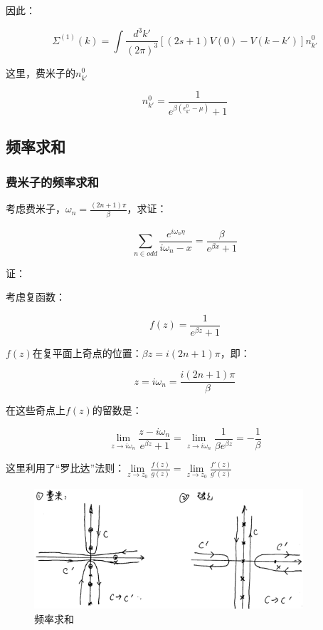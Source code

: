 因此：

\begin{equation}
\Sigma^{(1)}(k) = \int \frac{d^3 k'}{(2 \pi)^3} \left[ (2s+1)V(0) - V(k - k') \right] n^0_{k'}
\end{equation}

这里，费米子的$n^0_{k'}$

\begin{equation}
n^0_{k'} = \frac{1}{ e^{ \beta ( \epsilon^0_{k'} - \mu  ) } + 1 }
\end{equation}

\subsection{频率求和}

\subsubsection{费米子的频率求和}

考虑费米子，$\omega_n = \frac{ (2n+1) \pi}{\beta}$，求证：

\begin{equation}
\sum\limits_{n \in odd } \frac{e^{i \omega_n \eta}}{i \omega_n - x } =\frac{ \beta}{ e^{\beta x} + 1 }
\end{equation}

证：

考虑复函数：

\begin{equation}
f(z) = \frac{1}{e^{\beta z} + 1}
\end{equation}

$f(z)$在复平面上奇点的位置：$\beta z = i (2n +1) \pi$，即：

\begin{equation*}
z = i \omega_n = \frac{i (2n +1)\pi }{\beta}
\end{equation*}

在这些奇点上$f(z)$的留数是：

\begin{equation*}
\lim\limits_{z \to i\omega_n  } \frac{z - i \omega_n}{ e^{\beta z} + 1 } =  \lim\limits_{z \to i\omega_n  } \frac{1}{ \beta e^{\beta z}  } = - \frac{1}{\beta}
\end{equation*}

这里利用了“罗比达”法则：$\lim\limits_{z \to z_0} \frac{f(z)}{g(z)} = \lim\limits_{z \to z_0} \frac{ f'(z) }{ g'(z) } $

\begin{figure}[htbp]
\begin{center}
\includegraphics[width=10cm]{Finite/frequencysummation.png}
\caption{频率求和}
\end{center}
\end{figure}

